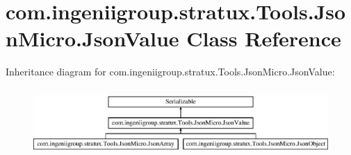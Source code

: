 \hypertarget{classcom_1_1ingeniigroup_1_1stratux_1_1_tools_1_1_json_micro_1_1_json_value}{}\section{com.\+ingeniigroup.\+stratux.\+Tools.\+Json\+Micro.\+Json\+Value Class Reference}
\label{classcom_1_1ingeniigroup_1_1stratux_1_1_tools_1_1_json_micro_1_1_json_value}
Inheritance diagram for com.\+ingeniigroup.\+stratux.\+Tools.\+Json\+Micro.\+Json\+Value\+:\begin{figure}[H]
\begin{center}
\leavevmode
\includegraphics[height=2.592592cm]{classcom_1_1ingeniigroup_1_1stratux_1_1_tools_1_1_json_micro_1_1_json_value}
\end{center}
\end{figure}
